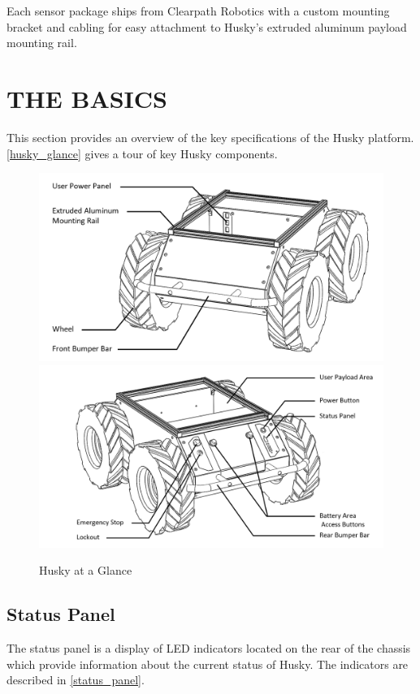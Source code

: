\documentclass[]{clearpath-latex/clearpath-manual}
\begin{document}
Each sensor package ships from Clearpath Robotics with a custom mounting bracket and cabling for easy attachment to Husky’s extruded aluminum payload mounting rail.


\section{THE BASICS}

This section provides an overview of the key specifications of the Husky platform. \autoref{husky_glance} gives a tour of key Husky components.


\begin{figure}[h]
  \centering
  \includegraphics[width=0.9\linewidth]{husky-front.PNG}
  \includegraphics[width=0.9\linewidth]{husky-rear.PNG}
  \caption{Husky at a Glance}
  \label{husky_glance}
\end{figure}
\newpage

\subsection{Status Panel}

The status panel is a display of LED indicators located on the rear of the chassis which 
provide information about the current status of Husky. The indicators are described in \autoref{status_panel}.
\end{document}
